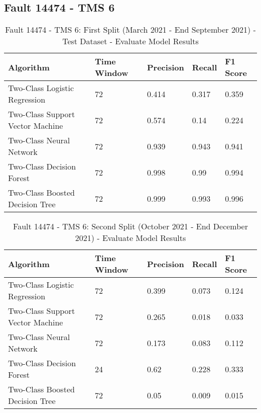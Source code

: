 \subsection{Fault 14474 - TMS 6}

\begin{table}[!ht]
    \centering
    \begin{tabular}{|l|l|l|l|l|}
    \hline
        Algorithm & Time Window & Precision & Recall & F1 Score \\ \hline
        Two-Class Logistic Regression & 72 & 0.414 & 0.317 & 0.359 \\ \hline
        Two-Class Support Vector Machine & 72 & 0.574 & 0.14 & 0.224 \\ \hline
        Two-Class Neural Network & 72 & 0.939 & 0.943 & 0.941 \\ \hline
        Two-Class Decision Forest & 72 & 0.998 & 0.99 & 0.994 \\ \hline
        Two-Class Boosted Decision Tree & 72 & 0.999 & 0.993 & 0.996 \\ \hline
    \end{tabular}
    \caption{Fault 14474 - TMS 6: First Split (March 2021 - End September 2021) - Test Dataset - Evaluate Model Results}
    \label{9112_SCA34_1st}
\end{table}

\begin{table}[!ht]
    \centering
    \begin{tabular}{|l|l|l|l|l|}
    \hline
        Algorithm & Time Window & Precision & Recall & F1 Score \\ \hline
        Two-Class Logistic Regression & 72 & 0.399 & 0.073 & 0.124 \\ \hline
        Two-Class Support Vector Machine & 72 & 0.265 & 0.018 & 0.033 \\ \hline
        Two-Class Neural Network & 72 & 0.173 & 0.083 & 0.112 \\ \hline
        Two-Class Decision Forest & 24 & 0.62 & 0.228 & 0.333 \\ \hline
        Two-Class Boosted Decision Tree & 72 & 0.05 & 0.009 & 0.015 \\ \hline
    \end{tabular}
    \caption{Fault 14474 - TMS 6: Second Split (October 2021 - End December 2021) - Evaluate Model Results}
    \label{9112_SCA34_1st}
\end{table}

